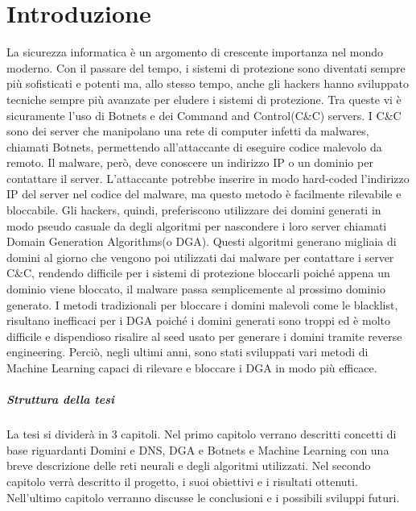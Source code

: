 \documentclass[12pt,a4paper,openright,twoside]{book}
\begin{document}
\chapter{Introduzione}
\label{chap:introduction}

La sicurezza informatica è un argomento di crescente importanza
nel mondo moderno. Con il passare del tempo,
i sistemi di protezione sono diventati sempre più sofisticati
e potenti ma, allo stesso tempo, anche gli hackers 
hanno sviluppato tecniche sempre più avanzate per eludere i sistemi di protezione.
Tra queste vi è sicuramente l'uso di Botnets e
dei Command and Control(C\&C) servers. I C\&C sono dei server che manipolano una rete
di computer infetti da malwares, chiamati Botnets, permettendo
all'attaccante di eseguire codice malevolo da remoto.
Il malware, però, deve conoscere un indirizzo IP o un dominio
per contattare il server. L'attaccante potrebbe
inserire in modo hard-coded l'indirizzo IP del server nel codice del malware,
ma questo metodo è facilmente rilevabile e bloccabile.
Gli hackers, quindi, preferiscono utilizzare dei domini
generati in modo pseudo casuale da degli algoritmi per nascondere i loro server chiamati
Domain Generation Algorithms(o DGA).
Questi algoritmi generano migliaia di domini al giorno
che vengono poi utilizzati dai malware per contattare i server C\&C,
rendendo difficile per i sistemi di protezione bloccarli
poiché appena un dominio viene bloccato, il malware passa semplicemente al prossimo dominio generato.
I metodi tradizionali per bloccare i domini malevoli come le blacklist,
risultano inefficaci per i DGA poiché i domini generati sono troppi
ed è molto difficile e dispendioso risalire al seed usato per generare i domini
tramite reverse engineering.
Perciò, negli ultimi anni, sono stati sviluppati vari metodi di Machine Learning
capaci di rilevare e bloccare i DGA in modo più efficace. \vfill
\paragraph{Struttura della tesi}
La tesi si dividerà in 3 capitoli. Nel primo
capitolo verrano descritti concetti di base riguardanti Domini e DNS, DGA e Botnets
e Machine Learning con una breve descrizione delle reti neurali e degli
algoritmi utilizzati. Nel secondo capitolo verrà descritto il progetto,
i suoi obiettivi e i risultati ottenuti. Nell'ultimo capitolo
verranno discusse le conclusioni e i possibili sviluppi futuri.
\end{document}
